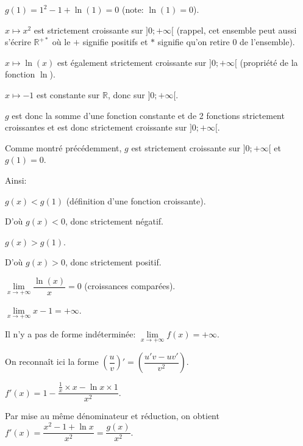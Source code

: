 \documentclass[a4paper,12pt]{scrartcl}
\begin{document}
\probleme{}

\partie{}


$g(1) = 1^2 - 1 + \ln(1) = 0$ (note: $\ln(1) = 0$).


$x \longmapsto x^2$ est strictement croissante sur $]0 ; +\infty[$ (rappel, cet ensemble peut aussi s'écrire $\mathbb{R}^{+*}$ où le $+$ signifie positifs et $*$ signifie qu'on retire 0 de l'ensemble).

$x \longmapsto \ln(x)$ est également strictement croissante sur $]0 ; +\infty[$ (propriété de la fonction $\ln$).

$x \longmapsto -1$ est constante sur $\mathbb{R}$, donc sur $]0 ; +\infty[$.

$g$ est donc la somme d'une fonction constante et de 2 fonctions strictement croissantes et est donc strictement croissante sur $]0 ; +\infty[$. 


Comme montré précédemment, $g$ est strictement croissante sur $]0 ; +\infty[$ et $g(1) = 0$.

Ainsi: 


$g(x) < g(1)$ (définition d'une fonction croissante).

D'où $g(x) < 0$, donc strictement négatif.


$g(x) > g(1)$.

D'où $g(x) > 0$, donc strictement positif.

\partie{}


$\lim\limits_{x\to+\infty} \dfrac{\ln(x)}{x} = 0$ (croissances comparées).

$\lim\limits_{x\to+\infty} x-1 = +\infty$.

Il n'y a pas de forme indéterminée: $\lim\limits_{x\to+\infty} f(x) = +\infty$.


On reconnaît ici la forme $\left( \dfrac{u}{v} \right)' = \left( \dfrac{u'v - uv'}{v^2} \right)$.

$f'(x) = 1- \dfrac{\frac{1}{x} \times x - \ln x \times 1}{x^2}$.

Par mise au même dénominateur et réduction, on obtient $f'(x) = \dfrac{x^2 - 1 + \ln x}{x^2} = \dfrac{g(x)}{x^2}$.
\end{document}
